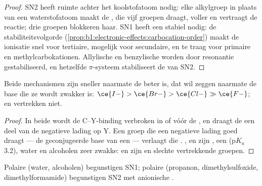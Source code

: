 \begin{proof}
SN2 heeft ruimte achter het koolstofatoom nodig: elke alkylgroep in plaats
van een waterstofatoom maakt de , die vijf groepen
draagt, voller en vertraagt de reactie; drie groepen blokkeren haar. SN1
heeft een stabiel  nodig: de stabiliteitsvolgorde
(\cref{prop:b1:electronic-effects:carbocation-order}) maakt de ionisatie
snel voor tertiaire, mogelijk voor secundaire, en te traag voor primaire
en methylcarbokationen. Allylische en benzylische  worden
door resonantie gestabiliseerd, en hetzelfde $\pi$-systeem stabiliseert
de  van SN2.
\end{proof}

\begin{proposition}\label{prop:b1:nucleophilic-substitution:leaving-group}
Beide mechanismen zijn sneller naarmate de  beter is,
dat wil zeggen naarmate de base die ze wordt zwakker is:
$\ce{I-} > \ce{Br-} > \ce{Cl-} \gg \ce{F-}$;  en 
vertrekken niet.
\end{proposition}

\begin{proof}
In beide wordt de C--Y-binding verbroken in of vóór de
, en draagt de  een deel van de
negatieve lading op Y. Een groep die een negatieve lading goed draagt ---
de geconjugeerde base van een  --- verlaagt die
. ,  en  zijn ,
 een  ($\mathrm{p}K_a$ 3.2), water en alcoholen zeer
zwakke:  en  zijn  en slechte vertrekkende
groepen.
\end{proof}

\begin{proposition}[Oplosmiddel]\label{prop:b1:nucleophilic-substitution:solvent}
Polaire  (water, alcoholen) begunstigen SN1;
polaire  (propanon, dimethylsulfoxide,
dimethylformamide) begunstigen SN2 met anionische .
\end{proposition}

